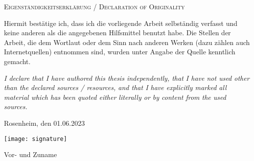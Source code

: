 {
\large
\thispagestyle{empty}
\vspace*{\fill}

\noindent
\textsc{Eigenständigkeitserklärung / Declaration of Originality}

\medskip

\noindent
Hiermit bestätige ich, dass ich die vorliegende Arbeit selbständig verfasst und keine anderen als die angegebenen Hilfsmittel benutzt habe. Die Stellen der Arbeit, die dem Wortlaut oder dem Sinn nach anderen Werken (dazu zählen auch Internetquellen) entnommen sind, wurden unter Angabe der Quelle kenntlich gemacht.

\medskip

\textit{I declare that I have authored this thesis independently, that I have not used other than the declared sources / resources, and that I have explicitly marked all material which has been quoted either literally or by content from the used sources.}

\bigskip

\noindent
Rosenheim, den 01.06.2023


\vspace*{0.5cm}
\noindent
\texttt{[image: signature]}
\vspace*{0.5cm}

\noindent
Vor- und Zuname
}

